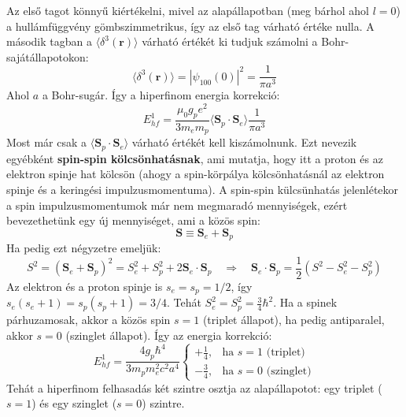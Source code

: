 \documentclass[../main.tex]{subfiles}
\begin{document}
Az első tagot könnyű kiértékelni, mivel az alapállapotban (meg bárhol ahol $l = 0$) a hullámfüggvény gömbszimmetrikus, így az első tag várható értéke nulla. A második tagban a $\langle \delta^3(\mathbf{r}) \rangle$ várható értékét ki tudjuk számolni a Bohr-sajátállapotokon:
\begin{equation}
    \langle \delta^3(\mathbf{r}) \rangle = |\psi_{100}(0)|^2 = \frac{1}{\pi a^3}
\end{equation}
Ahol $a$ a Bohr-sugár. Így a hiperfinom energia korrekció:
\begin{equation}
    E^1_{hf} = \frac{\mu_0 g_p e^2}{3 m_e m_p} \langle \mathbf{S}_p \cdot \mathbf{S}_e \rangle \frac{1}{\pi a^3}
\end{equation}
Most már csak a $\langle \mathbf{S}_p \cdot \mathbf{S}_e \rangle$ várható értékét kell kiszámolnunk. Ezt nevezik egyébként \textbf{spin-spin kölcsönhatásnak}, ami mutatja, hogy itt a proton és az elektron spinje hat kölcsön
(ahogy a spin-körpálya kölcsönhatásnál az elektron spinje és a keringési impulzusmomentuma). A spin-spin külcsünhatás jelenlétekor a spin impulzusmomentumok már nem megmaradó mennyiségek, ezért bevezethetünk egy új mennyiséget, ami a közös spin:
\begin{equation}
    \mathbf{S} \equiv \mathbf{S}_e + \mathbf{S}_p
\end{equation}
Ha pedig ezt négyzetre emeljük:
\begin{equation}
    S^2 = (\mathbf{S}_e + \mathbf{S}_p)^2 = S^2_e + S^2_p + 2 \mathbf{S}_e \cdot \mathbf{S}_p \quad \Rightarrow \quad \mathbf{S}_e \cdot \mathbf{S}_p = \frac{1}{2} (S^2 - S^2_e - S^2_p)
\end{equation}
Az elektron és a proton spinje is $s_e = s_p = 1/2$, így $s_e (s_e + 1) = s_p (s_p + 1) = 3/4$. Tehát $S_e^2 = S_p^2 = \frac{3}{4} \hbar^2$. Ha a spinek párhuzamosak, akkor a közös spin $s = 1$ (triplet állapot), ha pedig antiparalel, akkor $s = 0$ (szinglet állapot). Így az energia korrekció:
\begin{equation}
    E^1_{hf} = \frac{4 g_p \hbar^4}{3 m_p m^2_e c^2 a^4} \begin{cases}
        + \frac{1}{4}, & \text{ha } s = 1 \text{ (triplet)} \\
        - \frac{3}{4}, & \text{ha } s = 0 \text{ (szinglet)}
    \end{cases}
\end{equation}
Tehát a hiperfinom felhasadás két szintre osztja az alapállapotot: egy triplet ($s = 1$) és egy szinglet ($s = 0$) szintre.
\end{document}
